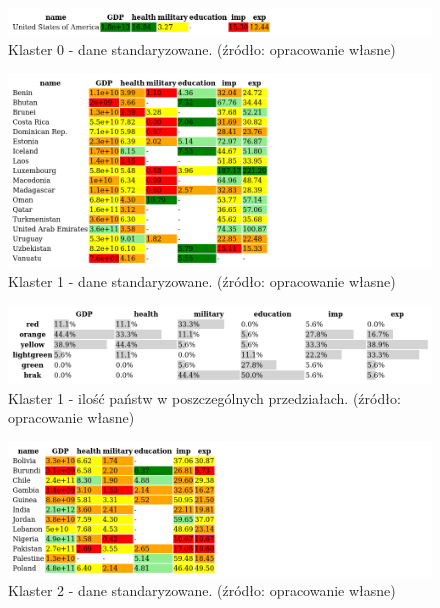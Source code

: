 \documentclass[11pt]{report}
\begin{document}
    \begin{figure}[ht!]
        \centering
        \includegraphics[width=1 \textwidth]{tables/CLUST/cluster0stdkmeans.png}
        \caption{Klaster 0 - dane standaryzowane. (źródło: opracowanie własne)}
        \label{tab:cl0std}
    \end{figure}

    

    \begin{figure}[ht!]
        \centering
        \includegraphics[width=1 \textwidth]{tables/CLUST/cluster1stdkmeans.png}
        \caption{Klaster 1 - dane standaryzowane. (źródło: opracowanie własne)}
        \label{tab:cl1std}
    \end{figure}

    \begin{figure}[ht!]
        \centering
        \includegraphics[width=1 \textwidth]{tables/CLUST/cluster1stdkmeanscount.png}
        \caption{Klaster 1 - ilość państw w poszczególnych przedziałach. (źródło: opracowanie własne)}
        \label{tab:cl1stdcount}
    \end{figure}

    

    \begin{figure}[ht!]
        \centering
        \includegraphics[width=1 \textwidth]{tables/CLUST/cluster2stdkmeans.png}
        \caption{Klaster 2 - dane standaryzowane. (źródło: opracowanie własne)}
        \label{tab:cl2std}
    \end{figure}
\end{document}
